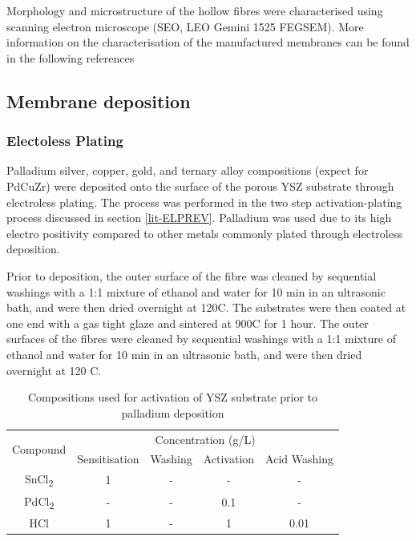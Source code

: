 Morphology and microstructure of the hollow fibres were characterised using scanning electron microscope (SEO, LEO Gemini 1525 FEGSEM). More information on the characterisation of the manufactured membranes can be found in the following references \cite{doi:https://doi.org/10.1002/9780470319475.ch3} \cite{doi:https://doi.org/10.1002/9780470319475.ch4}


\subsection{Membrane deposition}
\subsubsection{Electoless Plating}\label{elpproc}
Palladium silver, copper, gold, and ternary alloy compositions (expect for PdCuZr) were deposited onto the surface of the porous YSZ substrate through electroless plating. The process was performed in the two step activation-plating process discussed in section \ref{lit-ELPREV}. Palladium was used due to its high electro positivity compared to other metals commonly plated through electroless deposition. 

Prior to deposition, the outer surface of the fibre was cleaned by sequential washings with a 1:1 mixture of ethanol and water for 10 min in an ultrasonic bath, and were then dried overnight at 120\textdegree C. The substrates were then coated at one end with a gas tight glaze and sintered at 900\textdegree C for 1 hour. The outer surfaces of the fibres were cleaned by sequential washings with a 1:1 mixture of ethanol and water for 10 min in an ultrasonic bath, and were then dried overnight at 120 \textdegree C.

\begin{table}[]
  \centering
  \caption{Compositions used for activation of YSZ substrate prior to palladium deposition}
  \label{pretreat}
  \begin{tabular}{@{}ccccc@{}}
  \toprule
  \multicolumn{1}{l}{\multirow{2}{*}{Compound}} & \multicolumn{4}{c}{Concentration (g/L)}             \\ \cmidrule(l){2-5} 
  \multicolumn{1}{l}{}                          & Sensitisation & Washing & Activation & Acid Washing \\ \midrule
  SnCl\textsubscript{2}                                         & 1             & -       & -          & -            \\
  PdCl\textsubscript{2}                                         & -             & -       & 0.1        & -            \\
  HCl                                           & 1             & -       & 1          & 0.01           \\ \bottomrule
  \end{tabular}
  \end{table}

